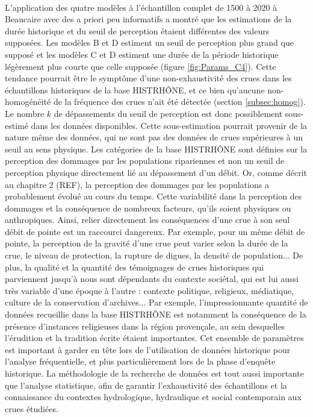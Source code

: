 \documentclass[11pt]{article}
\begin{document}
	\paragraph{} L'application des quatre modèles à l'échantillon complet de 1500 à 2020 à Beaucaire avec des a priori peu informatifs a montré que les estimations de la durée historique et du seuil de perception étaient différentes des valeurs supposées. Les modèles B et D estiment un seuil de perception plus grand que supposé et les modèles C et D estiment une durée de la période historique légèrement plus courte que celle supposée (figure \ref{fig:Params_C4}). Cette tendance pourrait être le symptôme d'une non-exhaustivité des crues dans les échantillons historiques de la base HISTRHÔNE, et ce bien qu'aucune non-homogénéité de la fréquence des crues n'ait été détectée (section \ref{subsec:homog}). Le nombre $k$ de dépassements du seuil de perception est donc possiblement sous-estimé dans les données disponibles. Cette sous-estimation pourrait provenir de la nature même des données, qui ne sont pas des données de crues supérieures à un seuil au sens physique. Les catégories de la base HISTRHÔNE sont définies sur la perception des dommages par les populations ripariennes et non un seuil de perception physique directement lié au dépassement d'un débit. Or, comme décrit au chapitre 2 (REF), la perception des dommages par les populations a probablement évolué au cours du temps. Cette variabilité dans la perception des dommages et la conséquence de nombreux facteurs, qu'ils soient physiques ou anthropiques. Ainsi, relier directement les conséquences d'une crue à son seul débit de pointe est un raccourci dangereux. Par exemple, pour un même débit de pointe, la perception de la gravité d'une crue peut varier selon la durée de la crue, le niveau de protection, la rupture de digues, la densité de population... De plus, la qualité et la quantité des témoignages de crues historiques qui parviennent jusqu'à nous sont dépendants du contexte sociétal, qui est lui aussi très variable d'une époque à l'autre : contexte politique, religieux, médiatique, culture de la conservation d'archives... Par exemple, l'impressionnante quantité de données recueillie dans la base HISTRHÔNE est notamment la conséquence de la présence d'instances religieuses dans la région provençale, au sein desquelles l'érudition et la tradition écrite étaient importantes. Cet ensemble de paramètres est important à garder en tête lors de l'utilisation de données historique pour l'analyse fréquentielle, et plus particulièrement lors de la phase d'enquête historique. La méthodologie de la recherche de données est tout aussi importante que l'analyse statistique, afin de garantir l'exhaustivité des échantillons et la connaissance du contextes hydrologique, hydraulique et social contemporain aux crues étudiées. 	
	
\end{document}
